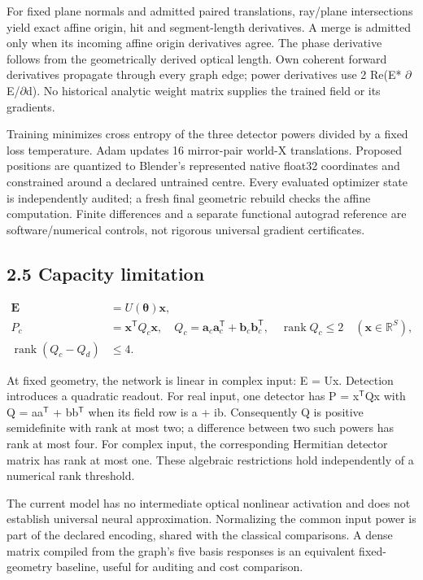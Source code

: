 \documentclass[11pt]{article}
\begin{document}
For fixed plane normals and admitted paired translations, ray/plane intersections yield exact affine origin, hit and segment-length derivatives. A merge is admitted only when its incoming affine origin derivatives agree. The phase derivative follows from the geometrically derived optical length. Own coherent forward derivatives propagate through every graph edge; power derivatives use 2 Re(E* $\partial$E/$\partial$d). No historical analytic weight matrix supplies the trained field or its gradients.

Training minimizes cross entropy of the three detector powers divided by a fixed loss temperature. Adam updates 16 mirror-pair world-X translations. Proposed positions are quantized to Blender's represented native float32 coordinates and constrained around a declared untrained centre. Every evaluated optimizer state is independently audited; a fresh final geometric rebuild checks the affine computation. Finite differences and a separate functional autograd reference are software/numerical controls, not rigorous universal gradient certificates.

\subsection*{2.5 Capacity limitation}
\begin{align}
 \mathbf{E}&=U(\boldsymbol{\theta})\mathbf{x},\\
 P_c&=\mathbf{x}^{\mathsf{T}}Q_c\mathbf{x},\quad Q_c=\mathbf{a}_c\mathbf{a}_c^{\mathsf{T}}+\mathbf{b}_c\mathbf{b}_c^{\mathsf{T}},\quad \operatorname{rank}Q_c\leq 2\quad(\mathbf{x}\in\mathbb{R}^S),\\
 \operatorname{rank}(Q_c-Q_d)&\leq 4.
\end{align}

At fixed geometry, the network is linear in complex input: E = Ux. Detection introduces a quadratic readout. For real input, one detector has P = x$^{\mathsf{T}}$Qx with Q = aa$^{\mathsf{T}}$ + bb$^{\mathsf{T}}$ when its field row is a + ib. Consequently Q is positive semidefinite with rank at most two; a difference between two such powers has rank at most four. For complex input, the corresponding Hermitian detector matrix has rank at most one. These algebraic restrictions hold independently of a numerical rank threshold.

The current model has no intermediate optical nonlinear activation and does not establish universal neural approximation. Normalizing the common input power is part of the declared encoding, shared with the classical comparisons. A dense matrix compiled from the graph's five basis responses is an equivalent fixed-geometry baseline, useful for auditing and cost comparison.
\end{document}
